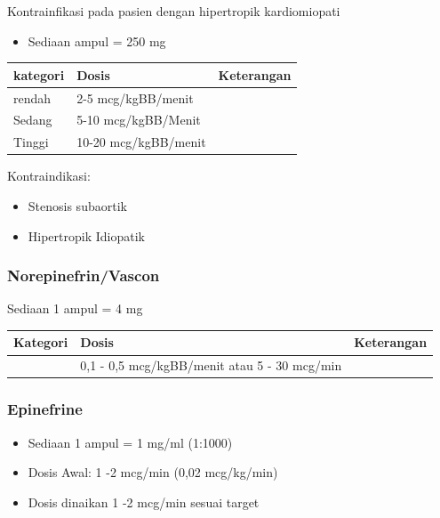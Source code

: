 \documentclass[
]{book}
\providecommand{\tightlist}{%
  \setlength{\itemsep}{0pt}\setlength{\parskip}{0pt}}
\begin{document}
Kontrainfikasi pada pasien dengan hipertropik kardiomiopati

\begin{itemize}
\tightlist
\item
  Sediaan ampul = 250 mg
\end{itemize}

\begin{longtable}[]{@{}lll@{}}
\toprule
kategori & Dosis & Keterangan \\
\midrule
\endhead
rendah & 2-5 mcg/kgBB/menit & \\
Sedang & 5-10 mcg/kgBB/Menit & \\
Tinggi & 10-20 mcg/kgBB/menit & \\
\bottomrule
\end{longtable}

Kontraindikasi:

\begin{itemize}
\tightlist
\item
  Stenosis subaortik
\item
  Hipertropik Idiopatik
\end{itemize}

\hypertarget{norepinefrinvascon}{%
\subsubsection{Norepinefrin/Vascon}\label{norepinefrinvascon}}

Sediaan 1 ampul = 4 mg

\begin{longtable}[]{@{}lll@{}}
\toprule
Kategori & Dosis & Keterangan \\
\midrule
\endhead
& 0,1 - 0,5 mcg/kgBB/menit atau 5 - 30 mcg/min & \\
\bottomrule
\end{longtable}

\hypertarget{epinefrine}{%
\subsubsection{Epinefrine}\label{epinefrine}}

\begin{itemize}
\item
  Sediaan 1 ampul = 1 mg/ml (1:1000)
\item
  Dosis Awal: 1 -2 mcg/min (0,02 mcg/kg/min)
\item
  Dosis dinaikan 1 -2 mcg/min sesuai target
\end{itemize}
\end{document}
